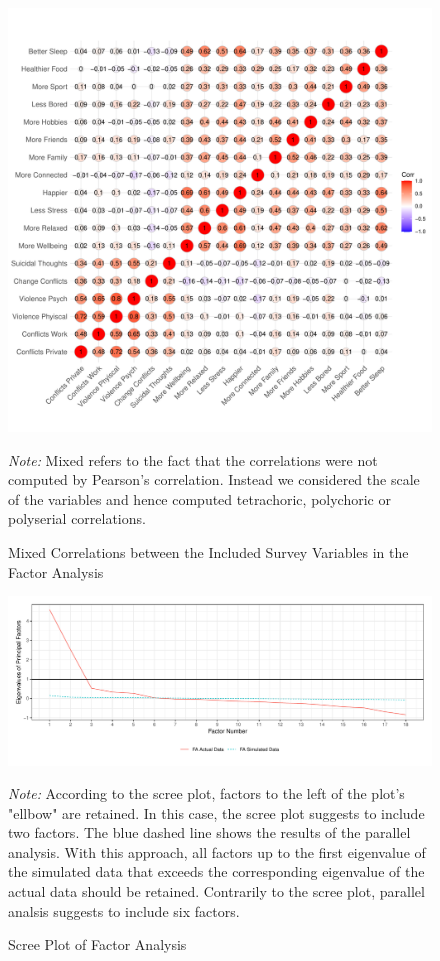 \documentclass[
  english,
  jou,floatsintext]{apa7}
\begin{document}
\begin{figure}[h!]
\caption{Mixed Correlations between the Included Survey Variables in the Factor Analysis}\label{fig:table-mix-cor}
\includegraphics[width=\textwidth]{plots/plot_mixed_cor} 

\textit{Note:} Mixed refers to the fact that the correlations were not computed by Pearson's correlation. Instead we considered the scale of the variables and hence computed tetrachoric, polychoric or polyserial correlations.
\end{figure}

\begin{figure}[h!]
\caption{Scree Plot of Factor Analysis}\label{fig:scree-plot}
\includegraphics[width=\textwidth]{plots/scree_plot} 

\textit{Note:} According to the scree plot, factors to the left of the plot's "ellbow" are retained. In this case, the scree plot suggests to include two factors. The blue dashed line shows the results of the parallel analysis. With this approach, all factors up to the first eigenvalue of the simulated data that exceeds the corresponding eigenvalue of the actual data should be retained. Contrarily to the scree plot, parallel analsis suggests to include six factors.
\end{figure}
\end{document}
